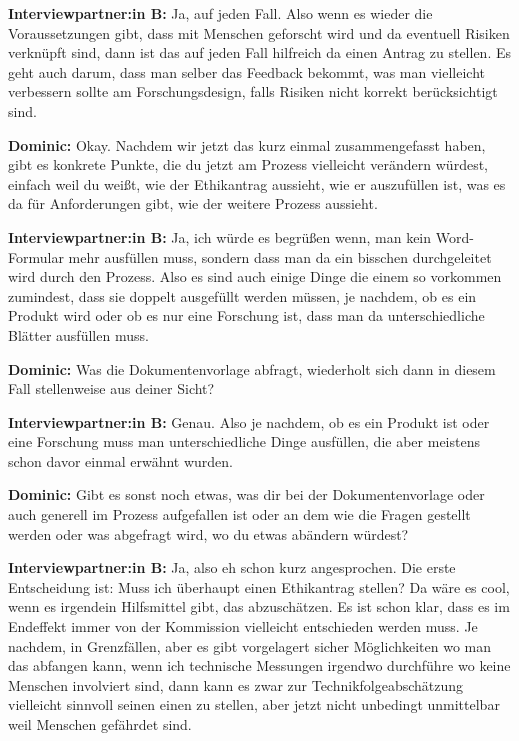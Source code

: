 \documentclass[a4paper,12pt,twoside]{scrreprt}
\begin{document}
\textbf{Interviewpartner:in B:} Ja, auf jeden Fall. Also wenn es wieder die Voraussetzungen gibt, dass mit Menschen geforscht wird und da eventuell Risiken verknüpft sind, dann ist das auf jeden Fall hilfreich da einen Antrag zu stellen. Es geht auch darum, dass man selber das Feedback bekommt, was man vielleicht verbessern sollte am Forschungsdesign, falls Risiken nicht korrekt berücksichtigt sind.

\textbf{Dominic:} Okay. Nachdem wir jetzt das kurz einmal zusammengefasst haben, gibt es konkrete Punkte, die du jetzt am Prozess vielleicht verändern würdest, einfach weil du weißt, wie der Ethikantrag aussieht, wie er auszufüllen ist, was es da für Anforderungen gibt, wie der weitere Prozess aussieht.

\textbf{Interviewpartner:in B:} Ja, ich würde es begrüßen wenn, man kein Word-Formular mehr ausfüllen muss, sondern dass man da ein bisschen durchgeleitet wird durch den Prozess. Also es sind auch einige Dinge die einem so vorkommen zumindest, dass sie doppelt ausgefüllt werden müssen, je nachdem, ob es ein Produkt wird oder ob es nur eine Forschung ist, dass man da unterschiedliche Blätter ausfüllen muss.

\textbf{Dominic:} Was die Dokumentenvorlage abfragt, wiederholt sich dann in diesem Fall stellenweise aus deiner Sicht?

\textbf{Interviewpartner:in B:} Genau. Also je nachdem, ob es ein Produkt ist oder eine Forschung muss man unterschiedliche Dinge ausfüllen, die aber meistens schon davor einmal erwähnt wurden.

\textbf{Dominic:} Gibt es sonst noch etwas, was dir bei der Dokumentenvorlage oder auch generell im Prozess aufgefallen ist oder an dem wie die Fragen gestellt werden oder was abgefragt wird, wo du etwas abändern würdest?

\textbf{Interviewpartner:in B:} Ja, also eh schon kurz angesprochen. Die erste Entscheidung ist: Muss ich überhaupt einen Ethikantrag stellen? Da wäre es cool, wenn es irgendein Hilfsmittel gibt, das abzuschätzen. Es ist schon klar, dass es im Endeffekt immer von der Kommission vielleicht entschieden werden muss. Je nachdem, in Grenzfällen, aber es gibt vorgelagert sicher Möglichkeiten wo man das abfangen kann, wenn ich technische Messungen irgendwo durchführe wo keine Menschen involviert sind, dann kann es zwar zur Technikfolgeabschätzung vielleicht sinnvoll seinen einen zu stellen, aber jetzt nicht unbedingt unmittelbar weil Menschen gefährdet sind.
\end{document}
